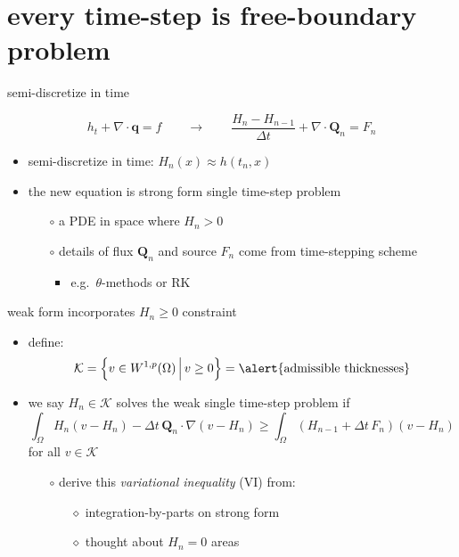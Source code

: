 \documentclass{beamer}
\newcommand\bq{\mathbf{q}}
\newcommand\bQ{\mathbf{Q}}
\newcommand\Div{\nabla\cdot}
\newcommand\grad{\nabla}
\begin{document}
\section{every time-step is free-boundary problem}

\begin{frame}{semi-discretize in time}

$$h_t + \Div\bq = f \qquad \to \qquad \frac{H_n - H_{n-1}}{\Delta t} + \Div \bQ_n = F_n$$

  \begin{itemize}
  \item semi-discretize in time: $H_n(x) \approx h(t_n,x)$
  \item the new equation is strong form \alert{single time-step problem}
    \begin{itemize}
    \item[$\circ$] a PDE in space where $H_n>0$
    \item[$\circ$] details of flux $\bQ_n$ and source $F_n$ come from time-stepping scheme
      \begin{itemize}
      \item e.g.~$\theta$-methods or RK
      \end{itemize}
    \end{itemize}
  \end{itemize}
\end{frame}


\begin{frame}{weak form incorporates $H_n\ge 0$ constraint}

  \begin{itemize}
  \item define:
    $$\mathcal{K} = \left\{v \in W^{1,p}(\Omega) \,\Big|\, v\ge 0\right\} = \text{\alert{admissible thicknesses}}$$
  \item we say $H_n \in \mathcal{K}$ solves the \alert{weak single time-step problem} if
    $$\int_\Omega H_n (v - H_n) - \Delta t\, \bQ_n \cdot \grad(v - H_n) \ge \int_\Omega \left(H_{n-1} + \Delta t\, F_n\right) (v - H_n)$$
  for all $v \in \mathcal{K}$
  \small
  \medskip
    \begin{itemize}
    \item[$\circ$] derive this \emph{variational inequality} (VI) from:
      \begin{itemize}
      \item[$\diamond$] integration-by-parts on strong form
      \item[$\diamond$] thought about $H_n=0$ areas
      \end{itemize}
    \end{itemize}
  \end{itemize}
\end{frame}
\end{document}
